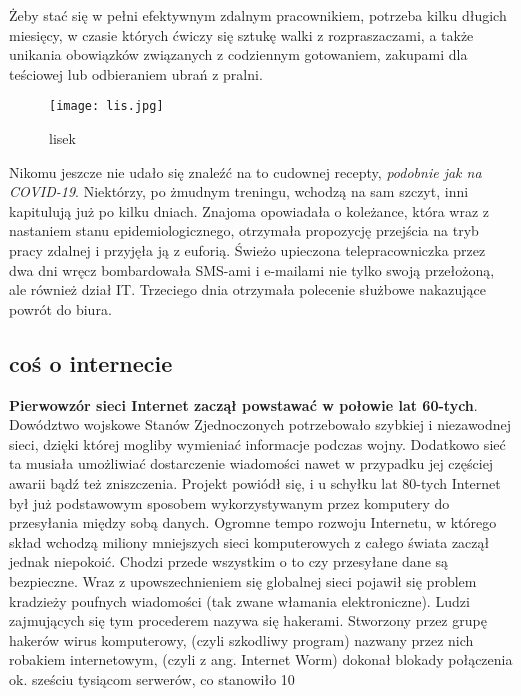 \documentclass{article}
\begin{document}
Żeby stać się w pełni efektywnym zdalnym pracownikiem, potrzeba kilku długich miesięcy, w czasie których ćwiczy się sztukę walki z rozpraszaczami, a także unikania obowiązków związanych z codziennym gotowaniem, zakupami dla teściowej lub odbieraniem ubrań z pralni. 
\begin{wrapfigure}{l}{0.5\textwidth}
\centering
\texttt{[image: lis.jpg]}
\caption{lisek}
\label{fig:wrapfig}
\end{wrapfigure}Nikomu jeszcze nie udało się znaleźć na to cudownej recepty, \textsl{podobnie jak na COVID-19}. Niektórzy, po żmudnym treningu, wchodzą na sam szczyt, inni kapitulują już po kilku dniach. Znajoma opowiadała o koleżance, która wraz z nastaniem stanu epidemiologicznego, otrzymała propozycję przejścia na tryb pracy zdalnej i przyjęła ją z euforią. Świeżo upieczona telepracowniczka przez dwa dni wręcz bombardowała SMS-ami i e-mailami nie tylko swoją przełożoną, ale również dział IT. Trzeciego dnia otrzymała polecenie służbowe nakazujące powrót do biura.
\newpage
\subsection{coś o internecie}
\textbf{Pierwowzór sieci Internet zaczął powstawać w połowie lat 60-tych}. Dowództwo wojskowe Stanów Zjednoczonych potrzebowało szybkiej i niezawodnej sieci, dzięki której mogliby wymieniać informacje podczas wojny. Dodatkowo sieć ta musiała umożliwiać dostarczenie wiadomości nawet w przypadku jej częściej awarii bądź też zniszczenia. Projekt powiódł się, i u schyłku lat 80-tych Internet był już podstawowym sposobem wykorzystywanym przez komputery do przesyłania między sobą danych. Ogromne tempo rozwoju Internetu, w którego skład wchodzą miliony mniejszych sieci komputerowych z całego świata zaczął jednak niepokoić. Chodzi przede wszystkim o to czy przesyłane dane są bezpieczne. Wraz z upowszechnieniem się globalnej sieci pojawił się problem kradzieży poufnych wiadomości (tak zwane włamania elektroniczne). Ludzi zajmujących się tym procederem nazywa się hakerami. Stworzony przez grupę hakerów wirus komputerowy, (czyli szkodliwy program) nazwany przez nich robakiem internetowym, (czyli z ang. Internet Worm) dokonał blokady połączenia ok. sześciu tysiącom serwerów, co stanowiło 10%
\end{document}

